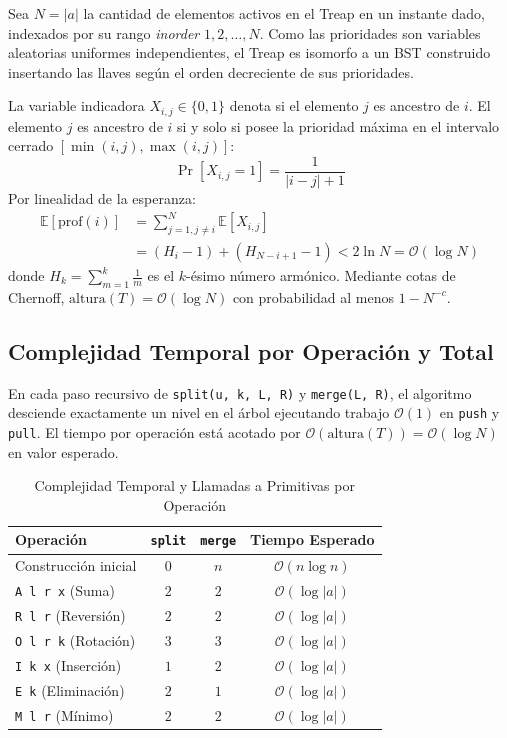 \documentclass[journal,10pt,a4paper]{IEEEtran}
\begin{document}
Sea $N = |a|$ la cantidad de elementos activos en el Treap en un instante dado, indexados por su rango \textit{inorder} $1, 2, \dots, N$. Como las prioridades son variables aleatorias uniformes independientes, el Treap es isomorfo a un BST construido insertando las llaves según el orden decreciente de sus prioridades.

La variable indicadora $X_{i,j} \in \{0, 1\}$ denota si el elemento $j$ es ancestro de $i$. El elemento $j$ es ancestro de $i$ si y solo si posee la prioridad máxima en el intervalo cerrado $[\min(i, j), \max(i, j)]$:
\begin{equation}
    \Pr[X_{i,j} = 1] = \frac{1}{|i - j| + 1}
\end{equation}
Por linealidad de la esperanza:
\begin{align}
    \mathbb{E}[\text{prof}(i)] &= \sum_{j=1, j \neq i}^{N} \mathbb{E}[X_{i,j}] \nonumber \\
    &= (H_i - 1) + (H_{N - i + 1} - 1) < 2 \ln N = \mathcal{O}(\log N)
\end{align}
donde $H_k = \sum_{m=1}^k \frac{1}{m}$ es el $k$-ésimo número armónico. Mediante cotas de Chernoff, $\text{altura}(T) = \mathcal{O}(\log N)$ con probabilidad al menos $1 - N^{-c}$.

\subsection{Complejidad Temporal por Operación y Total}

En cada paso recursivo de \texttt{split(u, k, L, R)} y \texttt{merge(L, R)}, el algoritmo desciende exactamente un nivel en el árbol ejecutando trabajo $\mathcal{O}(1)$ en \texttt{push} y \texttt{pull}. El tiempo por operación está acotado por $\mathcal{O}(\text{altura}(T)) = \mathcal{O}(\log N)$ en valor esperado.

\begin{table}[htbp]
\centering
\caption{Complejidad Temporal y Llamadas a Primitivas por Operación}
\label{tab:complejidad}
\footnotesize
\setlength{\tabcolsep}{4pt}
\begin{tabular}{lccc}
\toprule
\textbf{Operación} & \textbf{\texttt{split}} & \textbf{\texttt{merge}} & \textbf{Tiempo Esperado} \\
\midrule
Construcción inicial & $0$ & $n$ & $\mathcal{O}(n \log n)$ \\
\texttt{A l r x} (Suma) & $2$ & $2$ & $\mathcal{O}(\log |a|)$ \\
\texttt{R l r} (Reversión) & $2$ & $2$ & $\mathcal{O}(\log |a|)$ \\
\texttt{O l r k} (Rotación) & $3$ & $3$ & $\mathcal{O}(\log |a|)$ \\
\texttt{I k x} (Inserción) & $1$ & $2$ & $\mathcal{O}(\log |a|)$ \\
\texttt{E k} (Eliminación) & $2$ & $1$ & $\mathcal{O}(\log |a|)$ \\
\texttt{M l r} (Mínimo) & $2$ & $2$ & $\mathcal{O}(\log |a|)$ \\
\bottomrule
\end{tabular}
\end{table}
\end{document}
